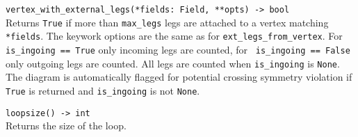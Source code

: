 \begin{basedescript}{\desclabelstyle{\pushlabel}}
   \item[\hspace{-1em}]\colorbox{gray!30}{\lstinline[style=py]{vertex_with_external_legs(*fields: Field, **opts) -> bool}} \vspace{0.1cm}\\
   Returns \texttt{True} if more than \texttt{max\_legs} legs are attached to a vertex matching \texttt{*fields}. The keywork options are the same as for \texttt{ext\_legs\_from\_vertex}. For \lstinline[style=py]| is_ingoing == True| only incoming legs are counted, for \lstinline[style=py]| is_ingoing == False| only outgoing legs are counted. All legs are counted when \texttt{is\_ingoing} is \texttt{None}. The diagram is automatically flagged for potential crossing symmetry violation if \texttt{True} is returned and \texttt{is\_ingoing} is not \texttt{None}.

   \item[\hspace{-1em}]\colorbox{gray!30}{\lstinline[style=py]|loopsize() -> int|} \vspace{0.1cm}\\
   Returns the size of the loop.
\end{basedescript}
